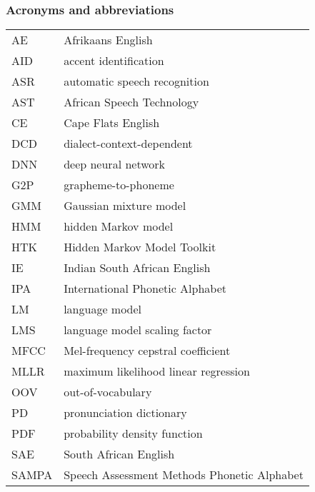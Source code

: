 \newpage
\subsubsection*{Acronyms and abbreviations}

\begingroup
\renewcommand{\arraystretch}{1.2}
\begin{tabular}{@{}p{2.5cm} l}
    AE      & Afrikaans English \\
    AID     & accent identification \\
    ASR     & automatic speech recognition \\
    AST     & African Speech Technology \\
    CE      & Cape Flats English \\
    DCD     & dialect-context-dependent \\
    DNN		& deep neural network \\
    G2P     & grapheme-to-phoneme \\
    GMM     & Gaussian mixture model \\
    HMM     & hidden Markov model \\
    HTK     & Hidden Markov Model Toolkit \\
    IE      & Indian South African English \\
    IPA     & International Phonetic Alphabet \\
    LM      & language model \\
    LMS     & language model scaling factor \\
    MFCC    & Mel-frequency cepstral coefficient \\
    MLLR    & maximum likelihood linear regression \\
    OOV     & out-of-vocabulary \\
    PD      & pronunciation dictionary \\
    PDF     & probability density function \\
    SAE     & South African English \\
    SAMPA   & Speech Assessment Methods Phonetic Alphabet \\
\end{tabular}
\endgroup

\begin{acronym}
\end{acronym}
